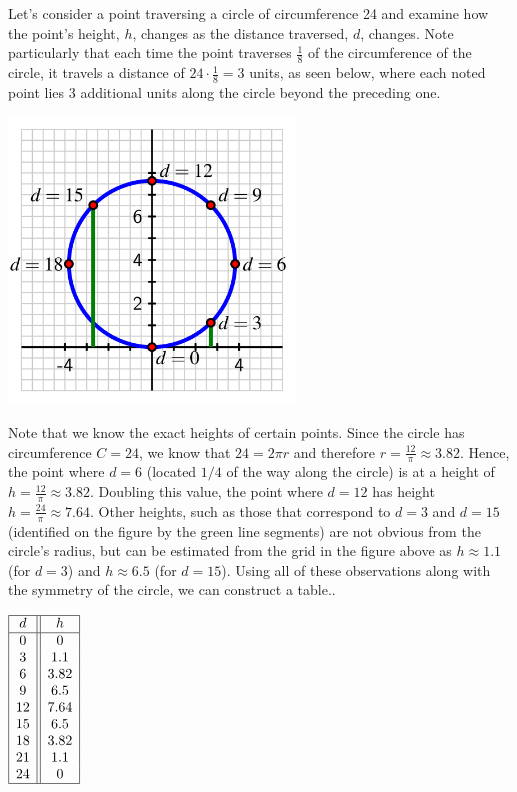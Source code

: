 \documentclass[nooutcomes]{ximera}
\begin{document}
Let's consider a point traversing a circle of circumference 24 and examine how the point's height, $h$, changes as the distance traversed, $d$, changes. Note particularly that each time the point traverses $\frac{1}{8}$ of the circumference of the circle, it travels a distance of $24 \cdot \frac{1}{8} = 3$ units, as seen below, where each noted point lies 3 additional units along the circle beyond the preceding one.


\begin{image}
\includegraphics[width=3in]{traversing-first-example.jpg}
\end{image}


Note that we know the exact heights of certain points. Since the circle has circumference $C = 24$, we know that $24 = 2\pi r$ and therefore $r = \frac{12}{\pi} \approx 3.82$.  Hence, the point where $d = 6$ (located $1/4$ of the way along the circle) is at a height of $h = \frac{12}{\pi} \approx 3.82$.  Doubling this value, the point where $d = 12$ has height $h = \frac{24}{\pi} \approx 7.64$.  Other heights, such as those that correspond to $d = 3$ and $d = 15$ (identified on the figure by the green line segments) are not obvious from the circle's radius, but can be estimated from the grid in the figure above as $h \approx 1.1$ (for $d = 3$) and $h \approx 6.5$ (for $d = 15$).  Using all of these observations along with the symmetry of the circle, we can construct a table..

\begin{center}
$
\begin{array}{ |c || c|  }
 \hline
 d & h\\
 \hline
 0&0\\
 3&1.1\\
 6&3.82\\
 9&6.5\\
 12&7.64\\
 15&6.5\\
 18&3.82\\
 21&1.1\\
 24&0\\
 \hline
\end{array}
$
\end{center}
\end{document}
